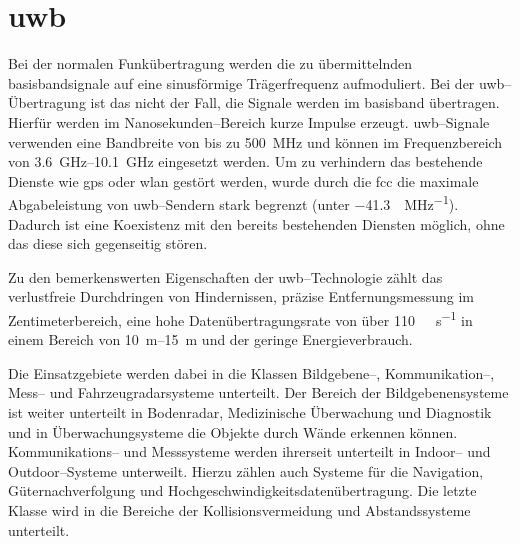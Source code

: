 \begin{comment}
Fragestellung:
- Welche elektrische Beschaltung ist notwendig um das DWM1000 Modul von DecaWave in Betrieb nehmen zu können?
- Wie erfolgt die Entfernungsmessung zwischen den einzelnen UWB--Modulen?
- Wie erfolgt der Datenaustausch zwischen einem UWB--Modul und der Verarbeitungseinheit?
\end{comment}

\begin{comment}
------------------------------------------------------------------------------------------
Schmalbandkommunikation (engl. Narrowband)
Frequenzband (engl. Radio spectrum)
Frequenzspreizung (engl. spread spectrum)
Basisband (engl. Baseband)
https://en.wikipedia.org/wiki/Ultra-wideband
\end{comment}
\chapter{\acrlong{uwb}}

Bei der normalen Funkübertragung werden die zu übermittelnden \Gls{basisband}signale auf eine sinusförmige Trägerfrequenz aufmoduliert. Bei der \Gls{uwb}--Übertragung ist das nicht der Fall, die Signale werden im \Gls{basisband} übertragen. Hierfür werden im Nanosekunden--Bereich kurze Impulse erzeugt. \Gls{uwb}--Signale verwenden eine Bandbreite von bis zu \SI{500}{\MHz} und können im Frequenzbereich von \SIrange{3.6}{10.1}{\GHz} eingesetzt werden. Um zu verhindern das bestehende Dienste wie \Gls{gps} oder \Gls{wlan} gestört werden, wurde durch die \Gls{fcc} die maximale Abgabeleistung von \Gls{uwb}--Sendern stark begrenzt (unter \SI[per-mode=symbol]{-41.3}{\dBm\per\MHz}). Dadurch ist eine Koexistenz mit den bereits bestehenden Diensten möglich, ohne das diese sich gegenseitig stören. \cite{win1998impulse, yang2004uwbcom, fontana2004recent, aiello2006ultra, yavari2014ultra}

Zu den bemerkenswerten Eigenschaften der \Gls{uwb}--Technologie zählt das verlustfreie Durchdringen von Hindernissen, präzise Entfernungsmessung im Zentimeterbereich, eine hohe Datenübertragungsrate von über \SI[per-mode=symbol]{110}{\mega\byte\per\second} in einem Bereich von \SIrange{10}{15}{\metre} und der geringe Energieverbrauch. \cite{yang2004uwbcom}

Die Einsatzgebiete werden dabei in die Klassen Bildgebene--, Kommunikation--, Mess-- und Fahrzeugradarsysteme unterteilt. Der Bereich der Bildgebenensysteme ist weiter unterteilt in Bodenradar, Medizinische Überwachung und Diagnostik und in Überwachungsysteme die Objekte durch Wände erkennen können. Kommunikations-- und Messsysteme werden ihrerseit unterteilt in Indoor-- und Outdoor--Systeme unterweilt. Hierzu zählen auch Systeme für die Navigation, Güternachverfolgung und Hochgeschwindigkeitsdatenübertragung. Die letzte Klasse wird in die Bereiche der Kollisionsvermeidung und Abstandssysteme unterteilt. \cite{yang2004uwbcom, lakkundi2006ultra, pan2007medical}


